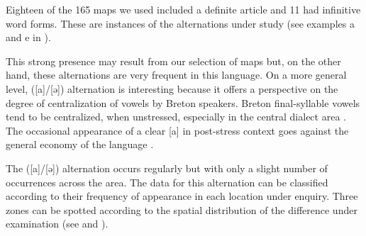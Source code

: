 \documentclass[output=paper]{LSP/langsci}
\begin{document}
\begin{table}
\caption{Phonetic contexts for the alternations ([a]/[ə])}
\label{tab:5}
\end{table}

Eighteen of the 165 maps we used included a definite article and 11 had infinitive word forms. These are instances of the alternations under study (see examples a and e in ).

This strong presence may result from our selection of maps but, on the other hand, these alternations are very frequent in this language. On a more general level, ([a]/[ə]) alternation is interesting because it offers a perspective on the degree of centralization of vowels by Breton speakers. Breton final-syllable vowels tend to be centralized, when unstressed, especially in the central dialect area \citep[8-10]{wmffre_central_1998}. The occasional appearance of a clear [a] in post-stress context goes against the general economy of the language \citep{martinet_economie_1955}.

The ([a]/[ə]) alternation occurs regularly but with only a slight number of occurrences across the area. The data for this alternation can be classified according to their frequency of appearance in each location under enquiry. Three zones can be spotted according to the spatial distribution of the difference under examination (see  and ).
\end{document}
